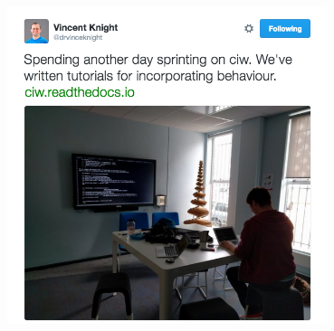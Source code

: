 \documentclass{beamer}
\begin{document}
\begin{frame}
  \begin{center}
  \href{https://twitter.com/drvinceknight/status/732186687338651648}{\includegraphics[width=0.7\textwidth]{tweets/sprinting_2}}
  \end{center}
\end{frame}
\end{document}
